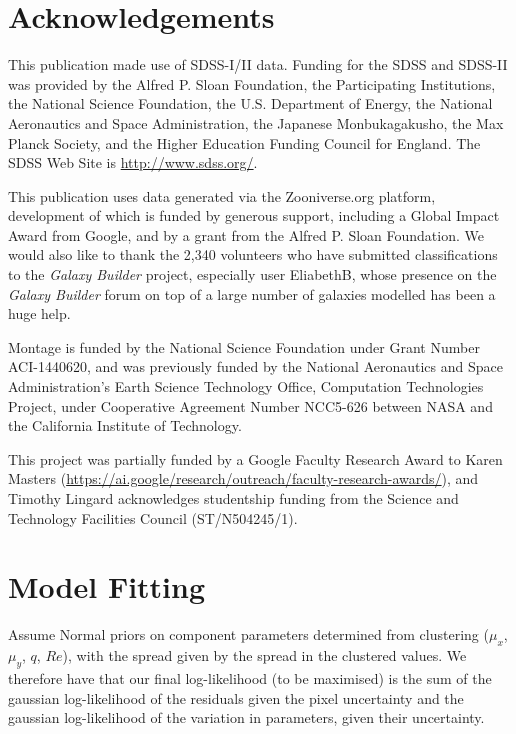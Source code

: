\documentclass[trackchanges]{aastex63}
\begin{document}
\section{Acknowledgements}
\label{sec:acknowledgements}

This publication made use of SDSS-I/II data. Funding for the SDSS and SDSS-II was provided by the Alfred P. Sloan Foundation, the Participating Institutions, the National Science Foundation, the U.S. Department of Energy, the National Aeronautics and Space Administration, the Japanese Monbukagakusho, the Max Planck Society, and the Higher Education Funding Council for England. The SDSS Web Site is \url{http://www.sdss.org/}.

This publication uses data generated via the Zooniverse.org platform, development of which is funded by generous support, including a Global Impact Award from Google, and by a grant from the Alfred P. Sloan Foundation. We would also like to thank the 2,340 volunteers who have submitted classifications to the \textit{Galaxy Builder} project, especially user EliabethB, whose presence on the \textit{Galaxy Builder} forum on top of a large number of galaxies modelled has been a huge help.

Montage is funded by the National Science Foundation under Grant Number ACI-1440620, and was previously funded by the National Aeronautics and Space Administration's Earth Science Technology Office, Computation Technologies Project, under Cooperative Agreement Number NCC5-626 between NASA and the California Institute of Technology.

This project was partially funded by a Google Faculty Research Award to Karen Masters (\url{https://ai.google/research/outreach/faculty-research-awards/}), and Timothy Lingard acknowledges studentship funding from the Science and Technology Facilities Council (ST/N504245/1).

\appendix

\section{Model Fitting}
\label{sec:appendix_model_fitting}
Assume Normal priors on component parameters determined from clustering ($\mu_x$, $\mu_y$, $q$, $Re$), with the spread given by the spread in the clustered values. We therefore have that our final log-likelihood (to be maximised) is the sum of the gaussian log-likelihood of the residuals given the pixel uncertainty and the gaussian log-likelihood of the variation in parameters, given their uncertainty.
\end{document}
